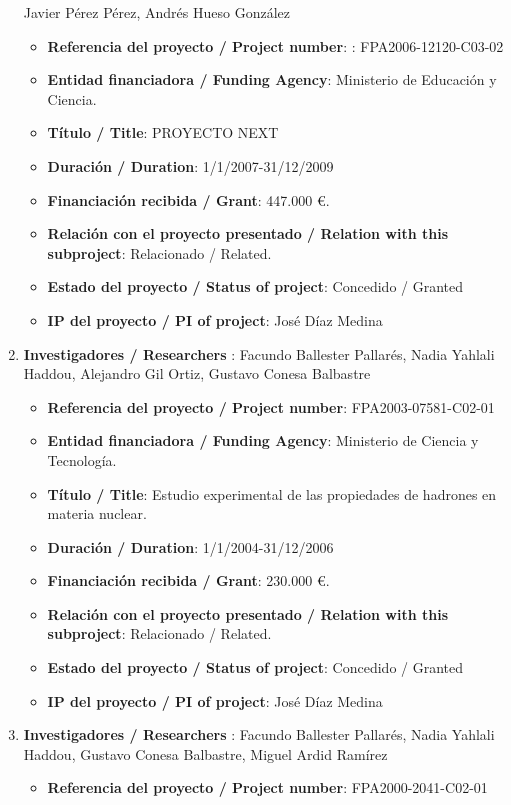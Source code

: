 \begin{enumerate}
Javier Pérez Pérez, Andrés Hueso González
\begin{itemize}
\item {\bf Referencia del proyecto / Project number}: : FPA2006-12120-C03-02
\item {\bf Entidad financiadora / Funding Agency}: Ministerio de Educación y Ciencia.
\item {\bf Título / Title}:  PROYECTO NEXT
\item {\bf Duración / Duration}: 1/1/2007-31/12/2009
\item {\bf Financiación recibida / Grant}:  447.000 \euro. 
\item {\bf Relación con el proyecto presentado / Relation with this subproject}:  Relacionado / Related. 
\item {\bf Estado del proyecto / Status of project}: Concedido / Granted
\item {\bf IP del proyecto / PI of project}: José Díaz Medina
\end{itemize}
\item {\bf Investigadores / Researchers }: Facundo Ballester Pallarés, Nadia Yahlali Haddou, Alejandro Gil Ortiz, Gustavo Conesa Balbastre
\begin{itemize}
\item {\bf Referencia del proyecto / Project number}: FPA2003-07581-C02-01
\item {\bf Entidad financiadora / Funding Agency}: Ministerio de Ciencia y Tecnología.
\item {\bf Título / Title}: Estudio experimental de las propiedades de hadrones en materia nuclear.
\item {\bf Duración / Duration}: 1/1/2004-31/12/2006
\item {\bf Financiación recibida / Grant}:  230.000  \euro. 
\item {\bf Relación con el proyecto presentado / Relation with this subproject}: Relacionado / Related. 
\item {\bf Estado del proyecto / Status of project}: Concedido / Granted
\item {\bf IP del proyecto / PI of project}: José Díaz Medina
\end{itemize}
\item {\bf Investigadores / Researchers }: Facundo Ballester Pallarés, Nadia Yahlali Haddou, Gustavo Conesa Balbastre, Miguel Ardid Ramírez
\begin{itemize}
\item {\bf Referencia del proyecto / Project number}: FPA2000-2041-C02-01

\end{itemize}
\end{enumerate}

